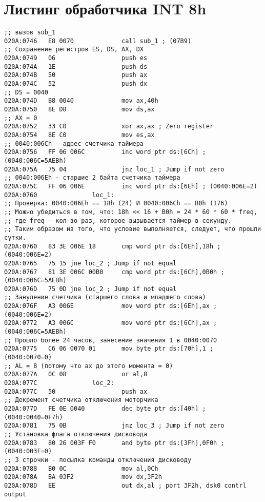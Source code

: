 \section*{Листинг обработчика INT 8h}

\begin{lstlisting}[style={asm}]
;; вызов sub_1
020A:0746   E8 0070             call sub_1 ; (07B9)
;; Сохранение регистров ES, DS, AX, DX
020A:0749   06                  push es
020A:074A   1E                  push ds
020A:074B   50                  push ax
020A:074C   52                  push dx
;; DS = 0040
020A:074D   B8 0040             mov ax,40h
020A:0750   8E D8               mov ds,ax
;; AX = 0
020A:0752   33 C0               xor ax,ax ; Zero register
020A:0754   8E C0               mov es,ax
;; 0040:006Ch - адрес счетчикa таймера
020A:0756   FF 06 006C          inc word ptr ds:[6Ch] ; (0040:006C=5AEBh)
020A:075A   75 04               jnz loc_1 ; Jump if not zero
;; 0040:006Еh - старшие 2 байта счетчика таймера
020A:075C   FF 06 006E          inc word ptr ds:[6Eh] ; (0040:006E=2)
020A:0760               loc_1:
;; Проверка: 0040:006Eh == 18h (24) И 0040:006Ch == B0h (176)
;; Можно убедиться в том, что: 18h << 16 + B0h = 24 * 60 * 60 * freq, 
;; где freq - кол-во раз, которое вызывается таймер в секунду.
;; Таким образом из того, что условие выполняется, следует, что прошли сутки.
020A:0760   83 3E 006E 18       cmp word ptr ds:[6Eh],18h ; (0040:006E=2)
020A:0765   75 15 jne loc_2 ; Jump if not equal
020A:0767   81 3E 006C 00B0     cmp word ptr ds:[6Ch],0B0h ; (0040:006C=5AEBh)
020A:076D   75 0D jne loc_2 ; Jump if not equal
;; Зануление счетчика (старшего слова и младшего слова)
020A:076F   A3 006E             mov word ptr ds:[6Eh],ax ; (0040:006E=2)
020A:0772   A3 006C             mov word ptr ds:[6Ch],ax ; (0040:006C=5AEBh)
;; Прошло более 24 часов, занесение значения 1 в 0040:0070
020A:0775   C6 06 0070 01       mov byte ptr ds:[70h],1 ; (0040:0070=0)
;; AL = 8 (потому что ax до этого момента = 0)
020A:077A   0C 08               or al,8
020A:077C               loc_2:
020A:077C   50                  push ax
;; Декремент счетчика отключения моторчика
020A:077D   FE 0E 0040          dec byte ptr ds:[40h] ; (0040:0040=0F7h)
020A:0781   75 0B               jnz loc_3 ; Jump if not zero
;; Установка флага отключения дисковода
020A:0783   80 26 003F F0       and byte ptr ds:[3Fh],0F0h ; (0040:003F=0)
;; 3 строчки - посылка команды отключения дисководу
020A:0788   B0 0C               mov al,0Ch
020A:078A   BA 03F2             mov dx,3F2h
020A:078D   EE                  out dx,al ; port 3F2h, dsk0 contrl output

\end{lstlisting}
